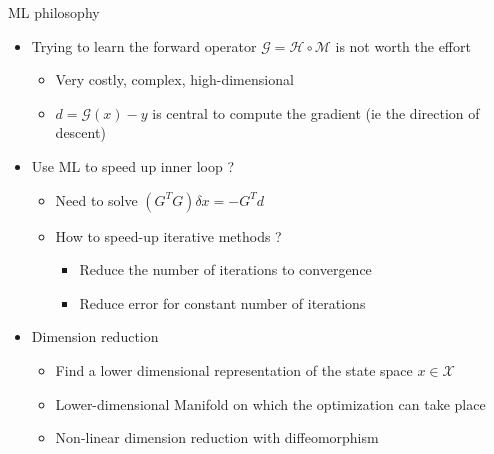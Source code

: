 \documentclass[10pt,aspectratio=169]{beamer}
\begin{document}
\begin{frame}{ML philosophy}
    \begin{itemize}
        \item Trying to learn the forward operator $\mathcal{G} = \mathcal{H} \circ \mathcal{M}$ is not worth the effort
        \begin{itemize}
            \item Very costly, complex, high-dimensional
            \item $d=\mathcal{G}(x) - y$ is central to compute the gradient (ie the direction of descent)
        \end{itemize}
        \item Use ML to speed up inner loop ?
        \begin{itemize}
            \item Need to solve $(G^T G) \delta x = -G^Td$
            \item {How to speed-up iterative methods ?} 
            \begin{itemize}
                \item Reduce the number of iterations to convergence 
                \item Reduce error for constant number of iterations
            \end{itemize}
        \end{itemize}
        
        \item \textcolor{gray!50}{Dimension reduction}
        \begin{itemize}
            \item \textcolor{gray!50}{Find a lower dimensional representation of the state space $x \in \mathcal{X}$}
            \item \textcolor{gray!50}{Lower-dimensional Manifold on which the optimization can take place}
            \item \textcolor{gray!50}{Non-linear dimension reduction with diffeomorphism}
        \end{itemize}
    \end{itemize}
\end{frame}
\end{document}

